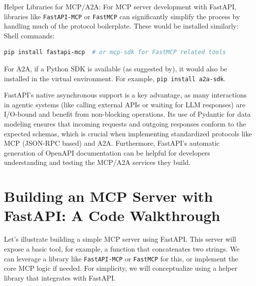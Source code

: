 Helper Libraries for MCP/A2A: For MCP server development with FastAPI, libraries like \texttt{FastAPI-MCP} or \texttt{FastMCP} can significantly 
simplify the process by handling much of the protocol boilerplate. These would be installed similarly:
Shell commands:
\begin{lstlisting}[language=bash]
pip install fastapi-mcp  # or mcp-sdk for FastMCP related tools
\end{lstlisting}

For A2A, if a Python SDK is available (as suggested by), it would also be installed in the virtual environment. For example, \texttt{pip install a2a-sdk}.

FastAPI's native asynchronous support is a key advantage, as many interactions in agentic systems (like calling external APIs or waiting for LLM responses) 
are I/O-bound and benefit from non-blocking operations. Its use of Pydantic for data modeling ensures that incoming requests and outgoing responses conform 
to the expected schemas, which is crucial when implementing standardized protocols like MCP (JSON-RPC based) and A2A. Furthermore, FastAPI's automatic 
generation of OpenAPI documentation can be helpful for developers understanding and testing the MCP/A2A services they build.

\section{Building an MCP Server with FastAPI: A Code Walkthrough}
Let's illustrate building a simple MCP server using FastAPI. This server will expose a basic tool, for example, a function that concatenates two strings. 
We can leverage a library like \texttt{FastAPI-MCP} or \texttt{FastMCP} for this, or implement the core MCP logic if needed. For simplicity, 
we will conceptualize using a helper library that integrates with FastAPI.

